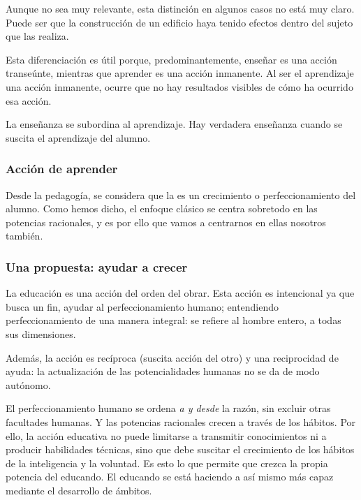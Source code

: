 \documentclass[palatino]{apuntesURJC}
\begin{document}
Aunque no sea muy relevante, esta distinción en algunos casos no está muy claro. 
%
Puede ser que la construcción de un edificio haya tenido efectos dentro del sujeto que las realiza.

Esta diferenciación es útil porque, predominantemente, enseñar es una acción transeúnte, mientras que aprender es una acción inmanente.
%
Al ser el aprendizaje una acción inmanente, ocurre que no hay resultados visibles de cómo ha ocurrido esa acción.

La enseñanza se subordina al aprendizaje.
%
Hay verdadera enseñanza cuando se suscita el aprendizaje del alumno.

\subsubsection{Acción de aprender} 

Desde la pedagogía, se considera que la  es un crecimiento o perfeccionamiento del alumno.
%
Como hemos dicho, el enfoque clásico se centra sobretodo en las potencias racionales, y es por ello que vamos a centrarnos en ellas nosotros también.


\subsubsection{Una propuesta: ayudar a crecer}

La educación es una acción del orden del obrar. 
%
Esta acción es intencional ya que busca un fin, ayudar al perfeccionamiento humano; entendiendo perfeccionamiento de una manera integral: se refiere al hombre entero, a todas sus dimensiones.

Además, la acción es recíproca (suscita acción del otro) y una reciprocidad de ayuda: la actualización de las potencialidades humanas no se da de modo autónomo.

El perfeccionamiento humano se ordena \textit{a y desde} la razón, sin excluir otras facultades humanas. 
%
Y las potencias racionales crecen a través de los hábitos.
%
Por ello, la acción educativa no puede limitarse a transmitir conocimientos ni a producir habilidades técnicas, sino que debe suscitar el crecimiento de los hábitos de la inteligencia y la voluntad.
%
Es esto lo que permite que crezca la propia potencia del educando.
%
El educando se está haciendo a así mismo más capaz mediante el desarrollo de ámbitos.
\end{document}
